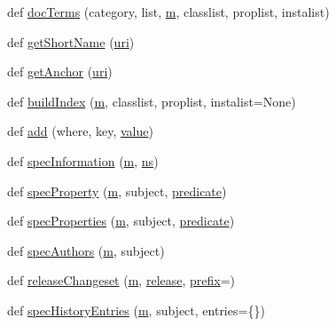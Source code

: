 \begin{DoxyCompactItemize}
\item 
def \hyperlink{namespacelv2specgen_a82e7017c87a27f10efa3f6c3b82cb14b}{doc\+Terms} (category, list, \hyperlink{layer3_8c_a4b8bfe70f28d6faddcb10d6ecf8c1989}{m}, classlist, proplist, instalist)
\item 
def \hyperlink{namespacelv2specgen_a26552e5311cbd53f1db4473d5bfb4e35}{get\+Short\+Name} (\hyperlink{lib_2expat_8h_a5a9fdd6c2606370ad12f24c078ac6585}{uri})
\item 
def \hyperlink{namespacelv2specgen_a00859cd12e72900be99a90f39923332e}{get\+Anchor} (\hyperlink{lib_2expat_8h_a5a9fdd6c2606370ad12f24c078ac6585}{uri})
\item 
def \hyperlink{namespacelv2specgen_a0269abb4fd1f49b5d481e7064599396b}{build\+Index} (\hyperlink{layer3_8c_a4b8bfe70f28d6faddcb10d6ecf8c1989}{m}, classlist, proplist, instalist=None)
\item 
def \hyperlink{namespacelv2specgen_a151c4ff01430f759d5894b830360b67a}{add} (where, key, \hyperlink{lib_2expat_8h_a4a30a13b813682e68c5b689b45c65971}{value})
\item 
def \hyperlink{namespacelv2specgen_a0538ad4020f919e0efe6f43d39c4d804}{spec\+Information} (\hyperlink{layer3_8c_a4b8bfe70f28d6faddcb10d6ecf8c1989}{m}, \hyperlink{xmltok_8c_ab6aec1346fb6c7b2733f0f73c9536ad2}{ns})
\item 
def \hyperlink{namespacelv2specgen_a6d86cb2d4e7061fa3dd9d93844ee6dcb}{spec\+Property} (\hyperlink{layer3_8c_a4b8bfe70f28d6faddcb10d6ecf8c1989}{m}, subject, \hyperlink{xlmath_8c_a767c5fa064d0a1e1f8b447769f1a890b}{predicate})
\item 
def \hyperlink{namespacelv2specgen_ae205368fb80b7d9a1b600f79ff4ace5f}{spec\+Properties} (\hyperlink{layer3_8c_a4b8bfe70f28d6faddcb10d6ecf8c1989}{m}, subject, \hyperlink{xlmath_8c_a767c5fa064d0a1e1f8b447769f1a890b}{predicate})
\item 
def \hyperlink{namespacelv2specgen_a5b42dcf834f41ebb6ba190883f2f9a42}{spec\+Authors} (\hyperlink{layer3_8c_a4b8bfe70f28d6faddcb10d6ecf8c1989}{m}, subject)
\item 
def \hyperlink{namespacelv2specgen_af274712374abf3f321bb6d63190cd2aa}{release\+Changeset} (\hyperlink{layer3_8c_a4b8bfe70f28d6faddcb10d6ecf8c1989}{m}, \hyperlink{libid3tag_2global_8h_a5af3e33e078602f154cba53f58df716c}{release}, \hyperlink{structprefix}{prefix}=\textquotesingle{}\textquotesingle{})
\item 
def \hyperlink{namespacelv2specgen_a6bcfdba28764e8dcffb60f2d76470447}{spec\+History\+Entries} (\hyperlink{layer3_8c_a4b8bfe70f28d6faddcb10d6ecf8c1989}{m}, subject, entries=\{\})

\end{DoxyCompactItemize}

